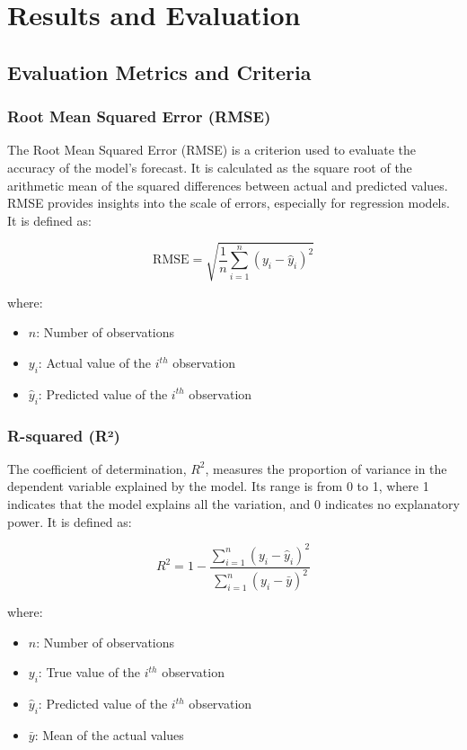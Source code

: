 
\chapter{Results and Evaluation}

\section{Evaluation Metrics and Criteria}

\subsection*{Root Mean Squared Error (RMSE)}
The Root Mean Squared Error (RMSE) is a criterion used to evaluate the accuracy of the model’s forecast. It is calculated as the square root of the arithmetic mean of the squared differences between actual and predicted values. RMSE provides insights into the scale of errors, especially for regression models. It is defined as:

\begin{equation}
\text{RMSE} = \sqrt{\frac{1}{n} \sum_{i=1}^{n} (y_i - \hat{y}_i)^2}
\end{equation}

where:
\begin{itemize}
    \item \( n \): Number of observations
    \item \( y_i \): Actual value of the \(i^{th}\) observation
    \item \( \hat{y}_i \): Predicted value of the \(i^{th}\) observation
\end{itemize}

\subsection*{R-squared (R²)}
The coefficient of determination, \(R^2\), measures the proportion of variance in the dependent variable explained by the model. Its range is from 0 to 1, where 1 indicates that the model explains all the variation, and 0 indicates no explanatory power. It is defined as:

\begin{equation}
R^2 = 1 - \frac{\sum_{i=1}^{n} (y_i - \hat{y}_i)^2}{\sum_{i=1}^{n} (y_i - \bar{y})^2}
\end{equation}

where:
\begin{itemize}
    \item \( n \): Number of observations
    \item \( y_i \): True value of the \(i^{th}\) observation
    \item \( \hat{y}_i \): Predicted value of the \(i^{th}\) observation
    \item \( \bar{y} \): Mean of the actual values
\end{itemize}

